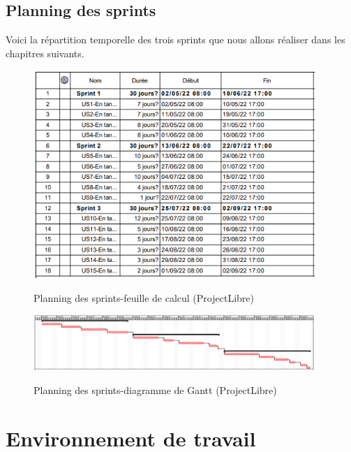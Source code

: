 \subsection{Planning des sprints}
Voici la répartition temporelle des trois sprints que nous allons réaliser dans les chapitres suivants.
\begin{figure}[!h]
	\centering
	{\includegraphics[width=0.95\textwidth]{D) IMAGES/PlanningdesSprints.png}}
	\caption{Planning des sprints-feuille de calcul (ProjectLibre)}
	\label{Org}
\end{figure}
\begin{figure}[!h]
	\centering
	{\includegraphics[width=0.95\textwidth]{D) IMAGES/PlanningDesSprintsGantt.png}}
	\caption{Planning des sprints-diagramme de Gantt (ProjectLibre)}
	\label{Org}
\end{figure}
\section{Environnement de travail}
